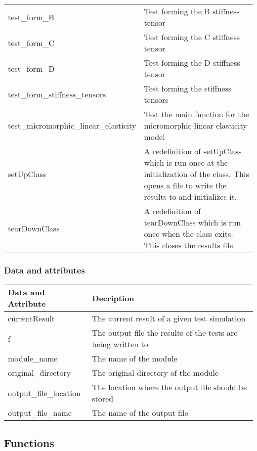 \documentclass{asme2ej}
\begin{document}
\begin{longtable}{ p{}  p{} }
test\_form\_B & Test forming the B stiffness tensor\\
test\_form\_C & Test forming the C stiffness tensor\\
test\_form\_D & Test forming the D stiffness tensor\\
test\_form\_stiffness\_tensors & Test forming the stiffness tensors\\
test\_micromorphic\_linear\_elasticity & Test the main function for the micromorphic linear elasticity model\\
setUpClass & A redefinition of setUpClass which is run once at the initialization of the class. This opens a file to write the results to and initializes it.\\
tearDownClass & A redefinition of tearDownClass which is run once when the class exits. This closes the results file.\\
\hline
\end{longtable}

\subsubsection{Data and attributes}
\begin{longtable}{ p{}  p{} }
\hline
Data and Attribute & Decription\\
\hline
\hline
currentResult & The current result of a given test simulation\\
f & The output file the results of the tests are being written to\\
module\_name & The name of the module\\
original\_directory & The original directory of the module\\
output\_file\_location & The location where the output file should be stored\\
output\_file\_name & The name of the output file\\
\hline
\end{longtable}

\subsection{Functions}
\end{document}
